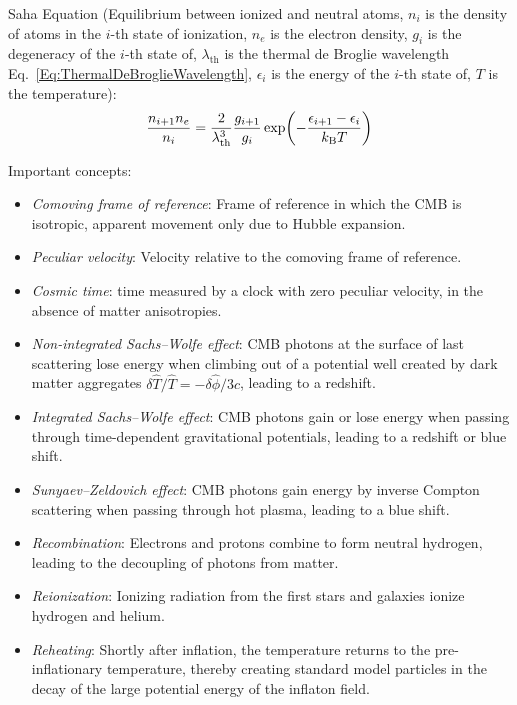 		\noindent
		Saha Equation (Equilibrium between ionized and neutral atoms, $n_i$ is the density of atoms in the $i$-th state of ionization, $n_e$ is the electron density, $g_i$ is the degeneracy of the $i$-th state of, $\lambda_\text{th}$ is the thermal de Broglie wavelength Eq.~\ref{Eq:ThermalDeBroglieWavelength}, $\epsilon_i$ is the energy of the $i$-th state of, $T$ is the temperature):
		\begin{equation}
			\frac{n_{i+1} n_e}{n_i} = \frac{2}{\lambda_\text{th}^3} \frac{g_{i+1}}{g_i} \exp(- \frac{\epsilon_{i+1}-\epsilon_{i}}{k_{\text{B}} T})
		\end{equation}


		\noindent
		Important concepts:
		\begin{itemize}
			\item \emph{Comoving frame of reference}: Frame of reference in which the CMB is isotropic, apparent movement only due to Hubble expansion.
			\item \emph{Peculiar velocity}: Velocity relative to the comoving frame of reference.
			\item \emph{Cosmic time}: time measured by a clock with zero peculiar velocity, in the absence of matter anisotropies.
			\item \emph{Non-integrated Sachs--Wolfe effect}: CMB photons at the surface of last scattering lose energy when climbing out of a potential well created by dark matter aggregates $\delta \hat{T} / \hat{T} = -\delta \hat{\phi} / 3c$, leading to a redshift.
			\item \emph{Integrated Sachs--Wolfe effect}: CMB photons gain or lose energy when passing through time-dependent gravitational potentials, leading to a redshift or blue shift.
			\item \emph{Sunyaev--Zeldovich effect}: CMB photons gain energy by inverse Compton scattering when passing through hot plasma, leading to a blue shift.
			\item \emph{Recombination}: Electrons and protons combine to form neutral hydrogen, leading to the decoupling of photons from matter.
			\item \emph{Reionization}: Ionizing radiation from the first stars and galaxies ionize hydrogen and helium.
			\item \emph{Reheating}: Shortly after inflation, the temperature returns to the pre-inflationary temperature, thereby creating standard model particles in the decay of the large potential energy of the inflaton field.

\end{itemize}
